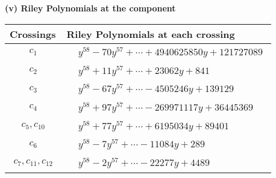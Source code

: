 \documentclass[1p]{elsarticle_modified}
\theoremstyle{definition}
\begin{document}
\newpage\renewcommand{\arraystretch}{1}
\flushleft \textbf{(v) Riley Polynomials at the component}\newline \\
\begin{tabular}{m{50pt}|m{274pt}}
Crossings & \hspace{64pt}Riley Polynomials at each crossing \\
\hline $$\begin{aligned}c_{1}\end{aligned}$$&$\begin{aligned}
&y^{58}-70 y^{57}+\cdots+4940625850 y+121727089
\end{aligned}$\\
\hline $$\begin{aligned}c_{2}\end{aligned}$$&$\begin{aligned}
&y^{58}+11 y^{57}+\cdots+23062 y+841
\end{aligned}$\\
\hline $$\begin{aligned}c_{3}\end{aligned}$$&$\begin{aligned}
&y^{58}-67 y^{57}+\cdots-4505246 y+139129
\end{aligned}$\\
\hline $$\begin{aligned}c_{4}\end{aligned}$$&$\begin{aligned}
&y^{58}+97 y^{57}+\cdots-269971117 y+36445369
\end{aligned}$\\
\hline $$\begin{aligned}c_{5},c_{10}\end{aligned}$$&$\begin{aligned}
&y^{58}+77 y^{57}+\cdots+6195034 y+89401
\end{aligned}$\\
\hline $$\begin{aligned}c_{6}\end{aligned}$$&$\begin{aligned}
&y^{58}-7 y^{57}+\cdots-11084 y+289
\end{aligned}$\\
\hline $$\begin{aligned}c_{7},c_{11},c_{12}\end{aligned}$$&$\begin{aligned}
&y^{58}-2 y^{57}+\cdots-22277 y+4489
\end{aligned}$\\

\end{tabular}
\end{document}
